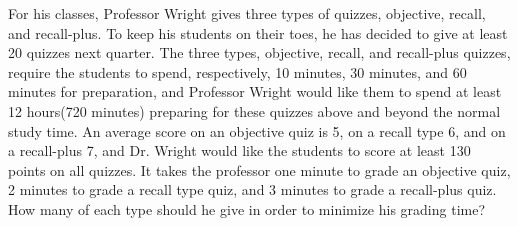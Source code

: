 \begin{puzzle}
    For his classes, Professor Wright gives three types of quizzes, objective, recall, and recall-plus.
    To keep his students on their toes, he has decided to give at least 20 quizzes next quarter. The
    three types, objective, recall, and recall-plus quizzes, require the students to spend, respectively,
    10 minutes, 30 minutes, and 60 minutes for preparation, and Professor Wright would like them
    to spend at least 12 hours(720 minutes) preparing for these quizzes above and beyond the normal
    study time. An average score on an objective quiz is 5, on a recall type 6, and on a recall-plus
    7, and Dr. Wright would like the students to score at least 130 points on all quizzes. It takes
    the professor one minute to grade an objective quiz, 2 minutes to grade a recall type quiz, and 3
    minutes to grade a recall-plus quiz. How many of each type should he give in order to minimize his
    grading time?
\end{puzzle}